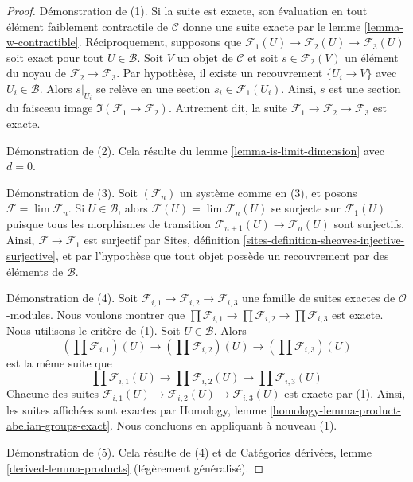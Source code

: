 \begin{proof}
Démonstration de (1). Si la suite est exacte, son évaluation en tout élément
faiblement contractile de $\mathcal{C}$ donne une suite exacte par le lemme
\ref{lemma-w-contractible}. Réciproquement, supposons que
$\mathcal{F}_1(U) \to \mathcal{F}_2(U) \to \mathcal{F}_3(U)$
soit exact pour tout $U \in \mathcal{B}$. Soit $V$ un objet de
$\mathcal{C}$ et soit $s \in \mathcal{F}_2(V)$ un élément du noyau de
$\mathcal{F}_2 \to \mathcal{F}_3$. Par hypothèse, il existe un recouvrement
$\{U_i \to V\}$ avec $U_i \in \mathcal{B}$. Alors $s|_{U_i}$ se relève en
une section $s_i \in \mathcal{F}_1(U_i)$. Ainsi, $s$ est une section du
faisceau image $\Im(\mathcal{F}_1 \to \mathcal{F}_2)$. Autrement dit, la
suite $\mathcal{F}_1 \to \mathcal{F}_2 \to \mathcal{F}_3$ est exacte.

\medskip\noindent
Démonstration de (2). Cela résulte du lemme
\ref{lemma-is-limit-dimension} avec $d = 0$.

\medskip\noindent
Démonstration de (3). Soit $(\mathcal{F}_n)$ un système comme en (3), et
posons $\mathcal{F} = \lim \mathcal{F}_n$. Si $U \in \mathcal{B}$, alors
$\mathcal{F}(U) = \lim \mathcal{F}_n(U)$
se surjecte sur $\mathcal{F}_1(U)$ puisque tous les morphismes de transition
$\mathcal{F}_{n + 1}(U) \to \mathcal{F}_n(U)$ sont surjectifs. Ainsi,
$\mathcal{F} \to \mathcal{F}_1$ est surjectif par Sites, définition
\ref{sites-definition-sheaves-injective-surjective}, et par l'hypothèse que
tout objet possède un recouvrement par des éléments de $\mathcal{B}$.

\medskip\noindent
Démonstration de (4). Soit
$\mathcal{F}_{i, 1} \to \mathcal{F}_{i, 2} \to \mathcal{F}_{i, 3}$
une famille de suites exactes de $\mathcal{O}$-modules. Nous voulons montrer
que
$\prod \mathcal{F}_{i, 1} \to \prod \mathcal{F}_{i, 2} \to
\prod \mathcal{F}_{i, 3}$ est exacte. Nous utilisons le critère de (1).
Soit $U \in \mathcal{B}$. Alors
$$
(\prod \mathcal{F}_{i, 1})(U) \to
(\prod \mathcal{F}_{i, 2})(U) \to
(\prod \mathcal{F}_{i, 3})(U)
$$
est la même suite que
$$
\prod \mathcal{F}_{i, 1}(U) \to
\prod \mathcal{F}_{i, 2}(U) \to
\prod \mathcal{F}_{i, 3}(U)
$$
Chacune des suites
$\mathcal{F}_{i, 1}(U) \to \mathcal{F}_{i, 2}(U) \to \mathcal{F}_{i, 3}(U)$
est exacte par (1). Ainsi, les suites affichées sont exactes par Homology,
lemme \ref{homology-lemma-product-abelian-groups-exact}. Nous concluons en
appliquant à nouveau (1).

\medskip\noindent
Démonstration de (5). Cela résulte de (4) et de Catégories dérivées, lemme
\ref{derived-lemma-products} (légèrement généralisé).


\end{proof}
